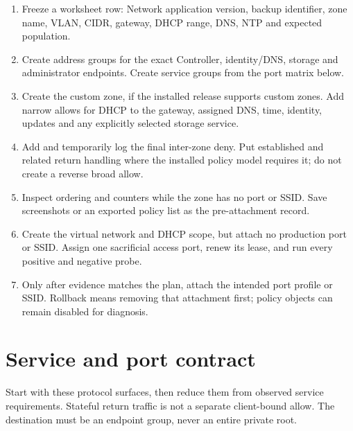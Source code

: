 \begin{enumerate}
\item Freeze a worksheet row: Network application version, backup identifier,
zone name, VLAN, CIDR, gateway, DHCP range, DNS, NTP and expected population.
\item Create address groups for the exact Controller, identity/DNS, storage and
administrator endpoints.  Create service groups from the port matrix below.
\item Create the custom zone, if the installed release supports custom zones.
Add narrow allows for DHCP to the gateway, assigned DNS, time, identity,
updates and any explicitly selected storage service.
\item Add and temporarily log the final inter-zone deny.  Put established and
related return handling where the installed policy model requires it; do not
create a reverse broad allow.
\item Inspect ordering and counters while the zone has no port or SSID.  Save
screenshots or an exported policy list as the pre-attachment record.
\item Create the virtual network and DHCP scope, but attach no production port
or SSID.  Assign one sacrificial access port, renew its lease, and run every
positive and negative probe.
\item Only after evidence matches the plan, attach the intended port profile or
SSID.  Rollback means removing that attachment first; policy objects can remain
disabled for diagnosis.
\end{enumerate}

\section{Service and port contract}
Start with these protocol surfaces, then reduce them from observed service
requirements.  Stateful return traffic is not a separate client-bound allow.
The destination must be an endpoint group, never an entire private root.

